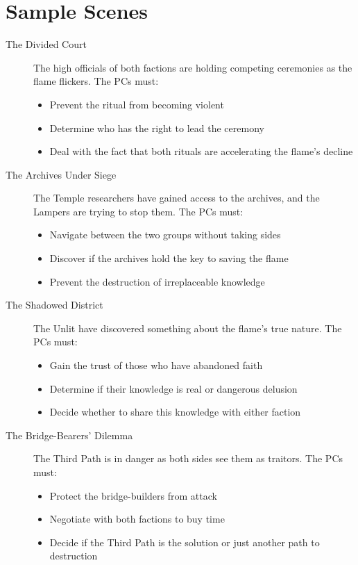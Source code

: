 \documentclass[12pt]{article}
\begin{document}
\section{Sample Scenes}

\begin{description}
    \item[The Divided Court]
    The high officials of both factions are holding competing ceremonies as the flame flickers. The PCs must:
    \begin{itemize}
        \item Prevent the ritual from becoming violent
        \item Determine who has the right to lead the ceremony
        \item Deal with the fact that both rituals are accelerating the flame's decline
    \end{itemize}
    
    \item[The Archives Under Siege]
    The Temple researchers have gained access to the archives, and the Lampers are trying to stop them. The PCs must:
    \begin{itemize}
        \item Navigate between the two groups without taking sides
        \item Discover if the archives hold the key to saving the flame
        \item Prevent the destruction of irreplaceable knowledge
    \end{itemize}
    
    \item[The Shadowed District]
    The Unlit have discovered something about the flame's true nature. The PCs must:
    \begin{itemize}
        \item Gain the trust of those who have abandoned faith
        \item Determine if their knowledge is real or dangerous delusion
        \item Decide whether to share this knowledge with either faction
    \end{itemize}
    
    \item[The Bridge-Bearers' Dilemma]
    The Third Path is in danger as both sides see them as traitors. The PCs must:
    \begin{itemize}
        \item Protect the bridge-builders from attack
        \item Negotiate with both factions to buy time
        \item Decide if the Third Path is the solution or just another path to destruction
    \end{itemize}
\end{description}
\end{document}
